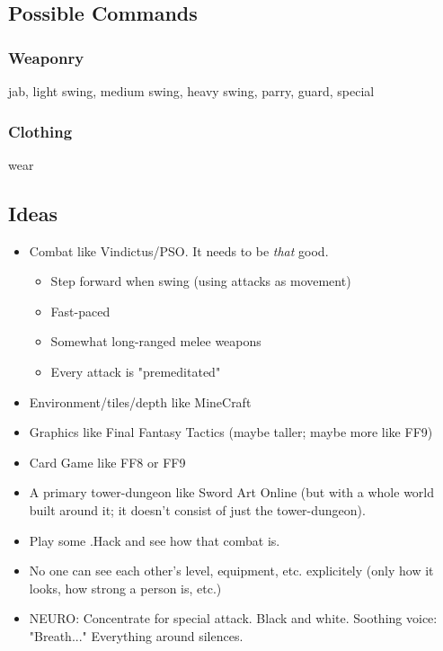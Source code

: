 \documentclass{article}
\begin{document}
\subsection*{Possible Commands} \subsubsection*{Weaponry} jab, light
swing, medium swing, heavy swing, parry, guard, special

\subsubsection*{Clothing} wear

\bigskip
\bigskip

\hline 

\subsection*{Ideas}
\begin{itemize}
    \item Combat like Vindictus/PSO. It needs to be \textit{that} good.
        \begin{itemize}
            \item Step forward when swing (using attacks as movement)
            \item Fast-paced
            \item Somewhat long-ranged melee weapons
            \item Every attack is "premeditated"
        \end{itemize}
    \item Environment/tiles/depth like MineCraft
    \item Graphics like Final Fantasy Tactics (maybe taller; maybe more like FF9)
    \item Card Game like FF8 or FF9
    \item A primary tower-dungeon like Sword Art Online (but with a 
        whole world built around it; it doesn't consist of just the
        tower-dungeon).
    \item Play some .Hack and see how that combat is.
    \item No one can see each other's level, equipment, etc.  
        explicitely (only how it looks, how strong a person is, etc.)
    \item NEURO: Concentrate for special attack. Black and white.  
        Soothing voice: "Breath..." Everything around silences.


\end{itemize}
\end{document}
